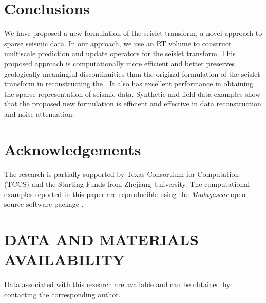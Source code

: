 \section{Conclusions}
    We have proposed a new formulation of the seislet transform, a novel 
    approach to sparse seismic data. 
    In our approach, we use an RT volume to construct multiscale prediction and 
    update operators for the seislet transform. 
    This proposed approach is computationally more efficient and better 
    preserves geologically meaningful discontinuities than the original 
    formulation of the seislet transform in reconstructing the . 
    It also has excellent performance in obtaining the sparse representation of
    seismic data.
    Synthetic and field data examples show that the proposed new 
    formulation is efficient and effective in data reconstruction and noise 
    attenuation.

\section{Acknowledgements}
    The research is partially supported by Texas Consortium for Computation (TCCS) and the Starting Funds from Zhejiang University. The computational examples reported in this paper are reproducible using the \emph{Madagascar} open-source software package \cite[]{Fomel2013}. 
    
\section{DATA AND MATERIALS AVAILABILITY}
Data associated with this research are available and can be obtained by contacting the corresponding author. 



